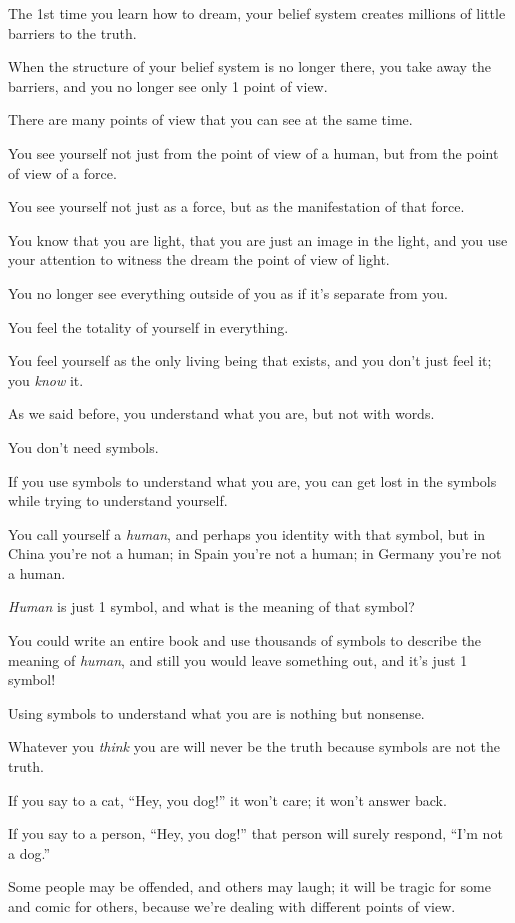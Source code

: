 \documentclass{article}
\numberwithin{equation}{section}
\begin{document}
%
The 1st time you learn how to dream, your belief system creates millions of little barriers to the truth.

When the structure of your belief system is no longer there, you take away the barriers, and you no longer see only 1 point of view.

There are many points of view that you can see at the same time.

You see yourself not just from the point of view of a human, but from the point of view of a force.

You see yourself not just as a force, but as the manifestation of that force.

You know that you are light, that you are just an image in the light, and you use your attention to witness the dream the point of view of light.

You no longer see everything outside of you as if it's separate from you.

You feel the totality of yourself in everything.

You feel yourself as the only living being that exists, and you don't just feel it; you \textit{know} it.

As we said before, you understand what you are, but not with words.

You don't need symbols.

If you use symbols to understand what you are, you can get lost in the symbols while trying to understand yourself.

You call yourself a \textit{human}, and perhaps you identity with that symbol, but in China you're not a human; in Spain you're not a human; in Germany you're not a human.

\textit{Human} is just 1 symbol, and what is the meaning of that symbol?

You could write an entire book and use thousands of symbols to describe the meaning of \textit{human}, and still you would leave something out, and it's just 1 symbol!

Using symbols to understand what you are is nothing but nonsense.

Whatever you \textit{think} you are will never be the truth because symbols are not the truth.

%
If you say to a cat, ``Hey, you dog!'' it won't care; it won't answer back.

If you say to a person, ``Hey, you dog!'' that person will surely respond, ``I'm not a dog.''

Some people may be offended, and others may laugh; it will be tragic for some and comic for others, because we're dealing with different points of view.
\end{document}

